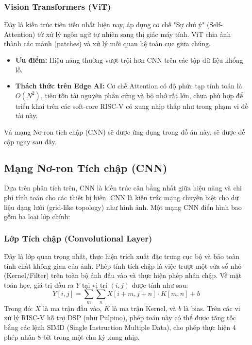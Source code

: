 \subsubsection{Vision Transformers (ViT)}
Đây là kiến trúc tiên tiến nhất hiện nay, áp dụng cơ chế "Sự chú ý" (Self-Attention) từ xử lý ngôn ngữ tự nhiên sang thị giác máy tính. ViT chia ảnh thành các mảnh (patches) và xử lý mối quan hệ toàn cục giữa chúng.
\begin{itemize}
    \item \textbf{Ưu điểm:} Hiệu năng thường vượt trội hơn CNN trên các tập dữ liệu khổng lồ.
    \item \textbf{Thách thức trên Edge AI:} Cơ chế Attention có độ phức tạp tính toán là $O(N^2)$, tiêu tốn tài nguyên phần cứng và bộ nhớ rất lớn, chưa phù hợp để triển khai trên các soft-core RISC-V có xung nhịp thấp như trong phạm vi đề tài này.
\end{itemize}
Và mạng Nơ-ron tích chập (CNN) sẽ được ứng dụng trong đồ án này, sẽ được đề cập ngay sau đây.

\subsection{Mạng Nơ-ron Tích chập (CNN)}
Dựa trên phân tích trên, CNN là kiến trúc cân bằng nhất giữa hiệu năng và chi phí tính toán cho các thiết bị biên. CNN là kiến trúc mạng chuyên biệt cho dữ liệu dạng lưới (grid-like topology) như hình ảnh. Một mạng CNN điển hình bao gồm ba loại lớp chính:

\subsubsection{Lớp Tích chập (Convolutional Layer)}

Đây là lớp quan trọng nhất, thực hiện trích xuất đặc trưng cục bộ và bảo toàn tính chất không gian của ảnh. Phép tính tích chập là việc trượt một cửa sổ nhỏ (Kernel/Filter) trên toàn bộ ảnh đầu vào và thực hiện phép nhân chập.
Về mặt toán học, giá trị đầu ra $Y$ tại vị trí $(i, j)$ được tính như sau:
\begin{equation}
Y[i, j] = \sum_{m} \sum_{n} X[i+m, j+n] \cdot K[m, n] + b
\end{equation}
Trong đó: $X$ là ma trận đầu vào, $K$ là ma trận Kernel, và $b$ là bias. Trên các vi xử lý RISC-V hỗ trợ DSP (như Pulpino), phép toán này có thể được tăng tốc bằng các lệnh SIMD (Single Instruction Multiple Data), cho phép thực hiện 4 phép nhân 8-bit trong một chu kỳ xung nhịp.

